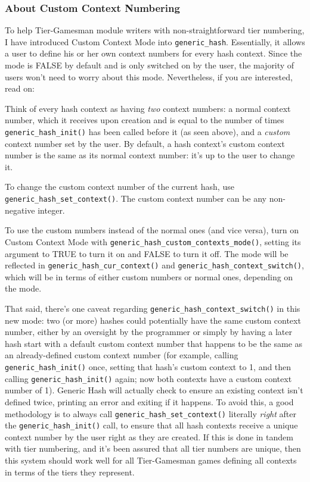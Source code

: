 \documentclass[11pt]{article}
\begin{document}
\subsubsection{About Custom Context Numbering}

To help Tier-Gamesman module writers with non-straightforward tier numbering, I have introduced Custom Context Mode into \texttt{generic\_hash}. Essentially, it allows a user to define his or her own context numbers for every hash context. Since the mode is FALSE by default and is only switched on by the user, the majority of users won't need to worry about this mode. Nevertheless, if you are interested, read on:

Think of every hash context as having \emph{two} context numbers: a normal context number, which it receives upon creation and is equal to the number of times \texttt{generic\_hash\_init()} has been called before it (as seen above), and a \emph{custom} context number set by the user. By default, a hash context's custom context number is the same as its normal context number: it's up to the user to change it.

To change the custom context number of the current hash, use \texttt{generic\_hash\_set\_context()}. The custom context number can be any non-negative integer.

To use the custom numbers instead of the normal ones (and vice versa), turn on Custom Context Mode with \texttt{generic\_hash\_custom\_contexts\_mode()}, setting its argument to TRUE to turn it on and FALSE to turn it off. The mode will be reflected in \texttt{generic\_hash\_cur\_context()} and \texttt{generic\_hash\_context\_switch()}, which will be in terms of either custom numbers or normal ones, depending on the mode.

That said, there's one caveat regarding \texttt{generic\_hash\_context\_switch()} in this new mode: two (or more) hashes could potentially have the same custom context number, either by an oversight by the programmer or simply by having a later hash start with a default custom context number that happens to be the same as an already-defined custom context number (for example, calling \texttt{generic\_hash\_init()} once, setting that hash's custom context to 1, and then calling \texttt{generic\_hash\_init()} again; now both contexts have a custom context number of 1). Generic Hash will actually check to ensure an existing context isn't defined twice, printing an error and exiting if it happens. To avoid this, a good methodology is to always call \texttt{generic\_hash\_set\_context()} literally \emph{right} after the \texttt{generic\_hash\_init()} call, to ensure that all hash contexts receive a unique context number by the user right as they are created. If this is done in tandem with tier numbering, and it's been assured that all tier numbers are unique, then this system should work well for all Tier-Gamesman games defining all contexts in terms of the tiers they represent.
\end{document}
